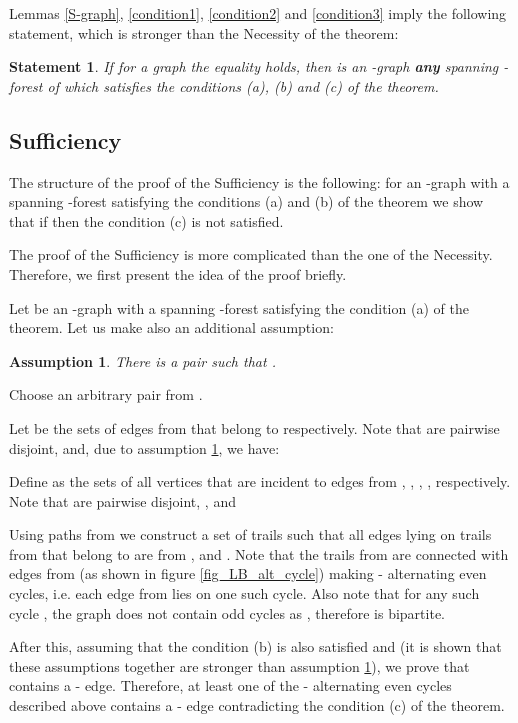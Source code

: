 \documentclass[a4paper, 12pt]{article}
\newtheorem{assumption}{Assumption}
\newtheorem{statement}{Statement}
\begin{document}
\bigskip
\bigskip

Lemmas \ref{S-graph}, \ref{condition1}, \ref{condition2} and
\ref{condition3} imply the following statement, which is stronger
than the Necessity of the theorem:

\begin{statement}\label{necessity}
If for a graph  the equality
 holds, then  is an
-graph \textbf{any} spanning -forest  of which satisfies
the conditions (a), (b) and (c) of the theorem.
\end{statement}

\subsection{Sufficiency}

The structure of the proof of the Sufficiency is the following: for
an -graph  with a spanning -forest  satisfying the
conditions (a) and (b) of the theorem we show that if
 then the condition (c)
is not satisfied.

The proof of the Sufficiency is more complicated than the one of the
Necessity. Therefore, we first present the idea of the proof
briefly.

Let  be an -graph with a spanning -forest  satisfying
the condition (a) of the theorem. Let us make also an additional
assumption:

\begin{assumption}\label{assumption_no_delta}
There is a pair  such that .
\end{assumption}

Choose an arbitrary pair  from .

Let  be the sets of edges from 
that belong to  respectively. Note that  are pairwise disjoint, and, due to assumption
\ref{assumption_no_delta}, we have:


Define  as the sets of all vertices that are
incident to edges from , , , ,
respectively. Note that  are pairwise disjoint, , and


Using paths from  we construct a set of trails  such that all edges lying on
trails from  that belong to  are from , and
. Note that the trails from  are connected with
edges from  (as shown in figure \ref{fig_LB_alt_cycle}) making
- alternating even cycles, i.e. each edge from 
lies on one such cycle. Also note that for any such cycle , the
graph  does not contain odd cycles as , therefore  is bipartite.

After this, assuming that the condition (b) is also satisfied and
 (it is shown that
these assumptions together are stronger than assumption
\ref{assumption_no_delta}), we prove that  contains a -
edge. Therefore, at least one of the - alternating
even cycles described above contains a - edge contradicting
the condition (c) of the theorem.
\end{document}
